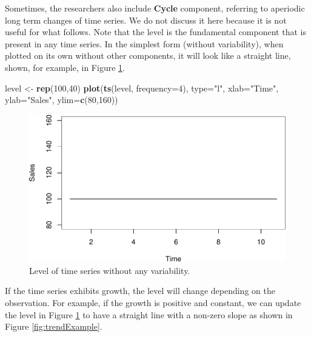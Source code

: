\documentclass[]{book}
\newenvironment{Shaded}{\begin{snugshade}}{\end{snugshade}}
\newcommand{\DataTypeTok}[1]{\textcolor[rgb]{0.13,0.29,0.53}{#1}}
\newcommand{\DecValTok}[1]{\textcolor[rgb]{0.00,0.00,0.81}{#1}}
\newcommand{\KeywordTok}[1]{\textcolor[rgb]{0.13,0.29,0.53}{\textbf{#1}}}
\newcommand{\NormalTok}[1]{#1}
\newcommand{\StringTok}[1]{\textcolor[rgb]{0.31,0.60,0.02}{#1}}
\theoremstyle{definition}
\theoremstyle{definition}
\theoremstyle{definition}
\theoremstyle{definition}
\theoremstyle{remark}
\begin{document}
Sometimes, the researchers also include \textbf{Cycle} component, referring to aperiodic long term changes of time series. We do not discuss it here because it is not useful for what follows. Note that the level is the fundamental component that is present in any time series. In the simplest form (without variability), when plotted on its own without other components, it will look like a straight line, shown, for example, in Figure \ref{fig:levelExample}.

\begin{Shaded}
\begin{Highlighting}[]
\NormalTok{level <-}\StringTok{ }\KeywordTok{rep}\NormalTok{(}\DecValTok{100}\NormalTok{,}\DecValTok{40}\NormalTok{)}
\KeywordTok{plot}\NormalTok{(}\KeywordTok{ts}\NormalTok{(level, }\DataTypeTok{frequency=}\DecValTok{4}\NormalTok{),}
     \DataTypeTok{type=}\StringTok{"l"}\NormalTok{, }\DataTypeTok{xlab=}\StringTok{"Time"}\NormalTok{, }\DataTypeTok{ylab=}\StringTok{"Sales"}\NormalTok{, }\DataTypeTok{ylim=}\KeywordTok{c}\NormalTok{(}\DecValTok{80}\NormalTok{,}\DecValTok{160}\NormalTok{))}
\end{Highlighting}
\end{Shaded}

\begin{figure}
\centering
\includegraphics{Svetunkov--2022----ADAM_files/figure-latex/levelExample-1.pdf}
\caption{\label{fig:levelExample}Level of time series without any variability.}
\end{figure}

If the time series exhibits growth, the level will change depending on the observation. For example, if the growth is positive and constant, we can update the level in Figure \ref{fig:levelExample} to have a straight line with a non-zero slope as shown in Figure \ref{fig:trendExample}.
\end{document}
